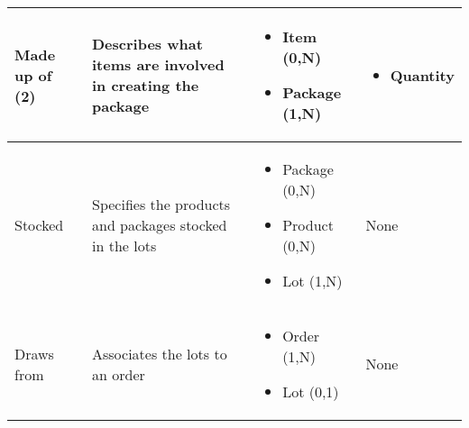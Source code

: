 \begin{longtable}{|p{}|p{} |p{}|p{} |}
Made up of (2) & Describes what items are involved in creating the package & \begin{itemize}
	\vspace{-1em}
	\item Item (0,N)
	\item Package (1,N)
\end{itemize}
&  \begin{itemize}
      	\vspace{-1em}
       	\item Quantity
   \end{itemize} \\\hline


Stocked  & Specifies the products and packages stocked in the lots & \begin{itemize}
	\vspace{-1em}
	\item Package (0,N)
	\item Product (0,N)
	\item Lot (1,N)
\end{itemize}
&  None \\\hline


Draws from & Associates the lots to an order & \begin{itemize}
	\vspace{-1em}
	\item Order (1,N)
	\item Lot (0,1)
\end{itemize}
&  None \\\hline

\end{longtable}